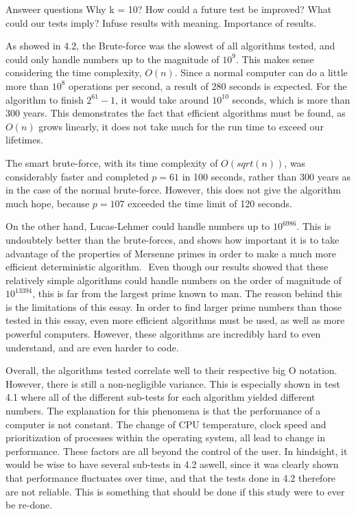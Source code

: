 \documentclass[main.tex]{subfiles}
\begin{document}
Answeer questions
Why k = 10?
How could a future test be improved?
What could our tests imply?
Infuse results with meaning.
Importance of results.

As showed in 4.2, the Brute-force was the slowest of all algorithms tested, and
could only handle numbers up to the magnitude of $10^{9}$. This makes sense
considering the time complexity, $O(n)$. Since a normal computer can do a little
more than $10^{8}$ operations per second, a result of 280 seconds is expected.
For the algorithm to finish $2^{61}-1$, it would take around $10^{10}$ seconds,
which is more than 300 years. This demonstrates the fact that efficient
algorithms must be found, as $O(n)$ grows linearly, it does not take much for
the run time to exceed our lifetimes.

The smart brute-force, with its time complexity of $O(sqrt(n))$, was
considerably faster and completed $p=61$ in 100 seconds, rather than 300 years
as in the case of the normal brute-force. However, this does not give the
algorithm much hope, because $p=107$ exceeded the time limit of 120 seconds.

On the other hand, Lucas-Lehmer could handle numbers up to $10^{6986}$. This is
undoubtely better than the brute-forces, and shows how important it is to take
advantage of the properties of Mersenne primes in order to make a much more
efficient deterministic algorithm. 
﻿
Even though our results showed that these relatively simple algorithms could
handle numbers on the order of magnitude of $10^{13394}$, this is far from the
largest prime known to man. The reason behind this is the limitations of this
essay. In order to find larger prime numbers than those tested in this essay,
even more efficient algorithms must be used, as well as more powerful computers.
However, these algorithms are incredibly hard to even understand, and are even
harder to code.

Overall, the algorithms tested correlate well to their respective big O
notation. However, there is still a non-negligible variance. This is especially
shown in test 4.1 where all of the different sub-tests for each algorithm
yielded different numbers. The explanation for this phenomena is that the
performance of a computer is not constant. The change of CPU temperature, clock
speed and prioritization of processes within the operating system, all lead to
change in performance. These factors are all beyond the control of the user. In
hindsight, it would be wise to have several sub-tests in 4.2 aswell, since it
was clearly shown that performance fluctuates over time, and that the tests done
in 4.2 therefore are not reliable. This is something that should be done if this
study were to ever be re-done. 
\end{document}
